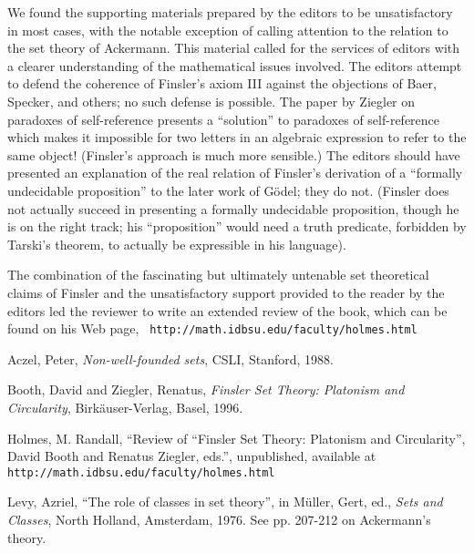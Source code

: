 We found the supporting materials prepared by the editors to be
unsatisfactory in most cases, with the notable exception of calling
attention to the relation to the set theory of Ackermann.  This
material called for the services of editors with a clearer
understanding of the mathematical issues involved.  The editors
attempt to defend the coherence of Finsler's axiom III against the
objections of Baer, Specker, and others; no such defense is possible.
The paper by Ziegler on paradoxes of self-reference presents a
``solution'' to paradoxes of self-reference which makes it impossible
for two letters in an algebraic expression to refer to the same
object!  (Finsler's approach is much more sensible.)  The editors
should have presented an explanation of the real relation of Finsler's
derivation of a ``formally undecidable proposition'' to the later work
of G\"odel; they do not.  (Finsler does not actually succeed in
presenting a formally undecidable proposition, though he is on the
right track; his ``proposition'' would need a truth predicate,
forbidden by Tarski's theorem, to actually be expressible in his
language).

The combination of the fascinating but ultimately untenable set
theoretical claims of Finsler and the unsatisfactory support provided
to the reader by the editors led the reviewer to write an extended
review of the book, which can be found on his Web page, {\tt
http://math.idbsu.edu/faculty/holmes.html}

Aczel, Peter, {\em Non-well-founded sets\/}, CSLI, Stanford, 1988.

Booth, David and Ziegler, Renatus, {\em Finsler Set Theory:  Platonism and Circularity\/}, Birk\"auser-Verlag, Basel, 1996.

Holmes, M. Randall, ``Review of ``Finsler Set Theory:
Platonism and Circularity'', David Booth and Renatus Ziegler, eds.'', unpublished, available at {\tt
http://math.idbsu.edu/faculty/holmes.html}

Levy, Azriel, ``The role of classes in set theory'', in M\"uller,
Gert, ed., {\em Sets and Classes\/}, North Holland, Amsterdam, 1976.
See pp. 207-212 on Ackermann's theory.











